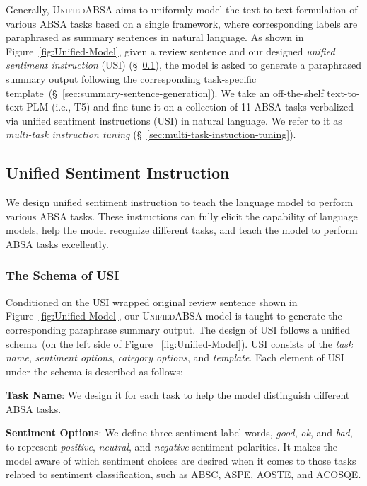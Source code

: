 \documentclass[11pt]{article}
\newcommand{\UnifiedABSA}{\textsc{UnifiedABSA}\xspace}
\newcommand{\USI}{\textsc{USI}\xspace}
\begin{document}
Generally, \UnifiedABSA aims to uniformly model the text-to-text formulation of various ABSA tasks based on a single framework, where corresponding labels are paraphrased as summary sentences in natural language. As shown in Figure~\ref{fig:Unified-Model}, given a review sentence and our designed \emph{unified sentiment instruction} (\USI) (\S~\ref{sec:usi}), the model is asked to generate a paraphrased summary output following the corresponding task-specific template~(\S~\ref{sec:summary-sentence-generation}). We take an off-the-shelf text-to-text PLM (i.e., T5) and fine-tune it on a collection of 11 ABSA tasks verbalized via unified sentiment instructions (\USI) in natural language. We refer to it as \emph{multi-task instruction tuning} (\S~\ref{sec:multi-task-instuction-tuning}).



\subsection{Unified Sentiment Instruction}
\label{sec:usi}


We design unified sentiment instruction to teach the language model to perform various ABSA tasks. These instructions can fully elicit the capability of language models, help the model recognize different tasks, and teach the model to perform ABSA tasks excellently.



\subsubsection{The Schema of \USI}


Conditioned on the \USI wrapped original review sentence shown in Figure~\ref{fig:Unified-Model}, our \UnifiedABSA model is taught to generate the corresponding paraphrase summary output. The design of \USI follows a unified schema~(on the left side of Figure ~\ref{fig:Unified-Model}). \USI consists of the \emph{task name}, \emph{sentiment options}, \emph{category options}, and \emph{template}. Each element of \USI under the schema is described as follows:

\noindent\textbf{Task Name}: We design it for each task to help the model distinguish different ABSA tasks.

\noindent\textbf{Sentiment Options}: We define three sentiment label words, \emph{good}, \emph{ok}, and \emph{bad}, to represent \emph{positive}, \emph{neutral}, and \emph{negative} sentiment polarities. It makes the model aware of which sentiment choices are desired when it comes to those tasks related to sentiment classification, such as ABSC, ASPE, AOSTE, and ACOSQE.
\end{document}
